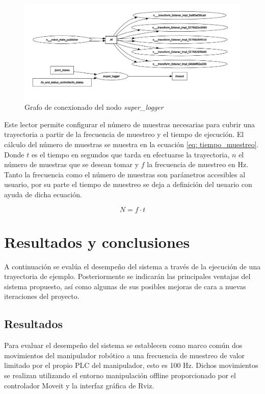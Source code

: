 \begin{figure}[h!]
    \centering
    \includegraphics[scale=0.15]{figuras/nodo super_logger rqt_graph.png}
    \caption{Grafo de conexionado del nodo \textit{super\_logger}}
    \label{fig:nodo super logger}
\end{figure}

Este lector permite configurar el número de muestras necesarias para cubrir una trayectoria a partir de la frecuencia de muestreo y el tiempo de ejecución. El cálculo del número de muestras se muestra en la ecuación \ref{eq: tiempo_muestreo}. Donde $t$ es el tiempo en segundos que tarda en efectuarse la trayectoria, $n$ el número de muestras que se desean tomar y $f$ la frecuencia de muestreo en Hz.
Tanto la frecuencia como el número de muestras son parámetros accesibles al usuario, por su parte el tiempo de muestreo se deja a definición del usuario con ayuda de dicha ecuación.

\begin{equation}
\label{eq: tiempo_muestreo}
    N = f\cdot t
\end{equation}


\section{Resultados y conclusiones}
A continuación se evalúa el desempeño del sistema a través de la ejecución de una trayectoria de ejemplo. Posteriormente se indicarán las principales ventajas del sistema propuesto, así como algunas de sus posibles mejoras de cara a nuevas iteraciones del proyecto.

\subsection{Resultados}
Para evaluar el desempeño del sistema se establecen como marco común  dos movimientos del manipulador robótico a una frecuencia de muestreo de valor  limitado por el propio \acrshort{PLC} del manipulador, esto es 100 Hz. Dichos movimientos se realizan utilizando el entorno manipulación offline proporcionado por el controlador Moveit y la interfaz gráfica de Rviz.

